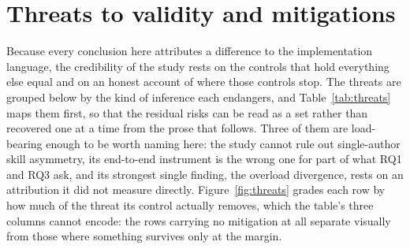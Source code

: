 \documentclass[english,twoside,openright,a4paper,censored,csm,software-track-2020]{HYthesisML}
\begin{document}
\section{Threats to validity and mitigations}\label{sec:threats}
Because every conclusion here attributes a difference to the implementation language, the
credibility of the study rests on the controls that hold everything else equal and on an
honest account of where those controls stop. The threats are grouped below by the kind of
inference each endangers, and Table~\ref{tab:threats} maps them first, so that the residual
risks can be read as a set rather than recovered one at a time from the prose that follows.
Three of them are load-bearing enough to be worth naming here: the study cannot rule out
single-author skill asymmetry, its end-to-end instrument is the wrong one for part of what
RQ1 and RQ3 ask, and its strongest single finding, the overload divergence, rests on an
attribution it did not measure directly. Figure~\ref{fig:threats} grades each row by how much of
the threat its control actually removes, which the table's three columns cannot encode: the rows
carrying no mitigation at all separate visually from those where something survives only at the
margin.
\end{document}
